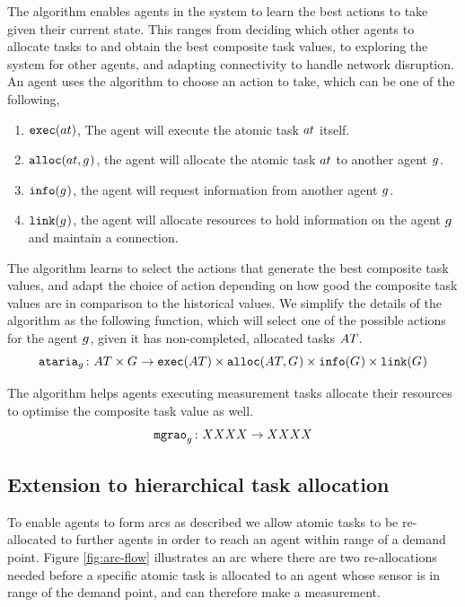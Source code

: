 The \acronymATARIAExtended{}{} algorithm enables agents in the system to learn the best actions to take given their current state. This ranges from deciding which other agents to allocate tasks to and obtain the best composite task values, to exploring the system for other agents, and adapting connectivity to handle network disruption. An agent uses the \acronymATARIA{}{} algorithm to choose an action to take, which can be one of the following,
\begin{enumerate}
	\item $\functionExec{}{}$, The agent will execute the atomic task $\varAtomicTask{}{}$ itself.
	\item $\functionAlloc{}{}$, the agent will allocate the atomic task $\varAtomicTask{}{}$ to another agent $g_{}^{}$.
	\item $\texttt{info}(g_{}^{})$, the agent will request information from another agent $g_{}^{}$.
	\item $\texttt{link}(g_{}^{})$, the agent will allocate resources to hold information on the agent $g_{}^{}$ and maintain a connection.
\end{enumerate}
The \acronymATARIA{}{} algorithm learns to select the actions that generate the best composite task values, and adapt the choice of action depending on how good the composite task values are in comparison to the historical values. We simplify the details of 
the algorithm as the following function, which will select one of the possible actions for the agent $g_{}^{}$, given it has non-completed, allocated tasks $\setAtomicTask{}{}$.
\begin{equation}
	\label{eq:ataria}
	\formalATARIA{}{}
\end{equation}

The \acronymMGRAOExtended{}{} algorithm helps agents executing measurement tasks allocate their resources to optimise the composite task value as well. 
\begin{equation}
	\label{eq:mgrao}
	\formalMGRAO{}{}
\end{equation}


\subsection{Extension to hierarchical task allocation}

To enable agents to form arcs as described we allow atomic tasks to be re-allocated to further agents in order to reach an agent within range of a demand point. Figure \ref{fig:arc-flow} illustrates an arc where there are two re-allocations needed before a specific atomic task is allocated to an agent whose sensor is in range of the demand point, and can therefore make a measurement.

